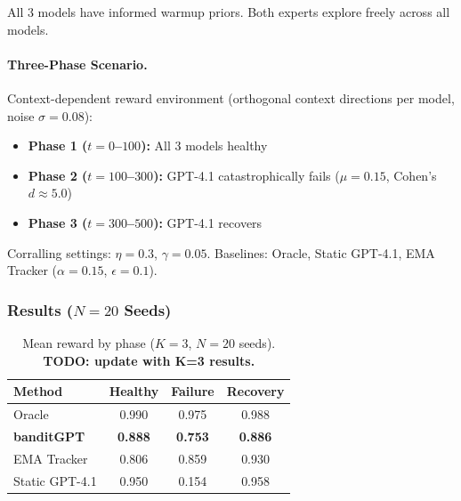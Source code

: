All 3 models have informed warmup priors. Both experts explore freely across all models.

\paragraph{Three-Phase Scenario.}
Context-dependent reward environment (orthogonal context directions per model, noise $\sigma=0.08$):

\begin{itemize}
    \item \textbf{Phase 1 ($t=0$--$100$):} All 3 models healthy
    \item \textbf{Phase 2 ($t=100$--$300$):} GPT-4.1 catastrophically fails ($\mu=0.15$, Cohen's $d\approx 5.0$)
    \item \textbf{Phase 3 ($t=300$--$500$):} GPT-4.1 recovers
\end{itemize}

Corralling settings: $\eta=0.3$, $\gamma=0.05$. Baselines: Oracle, Static GPT-4.1, EMA Tracker ($\alpha=0.15$, $\epsilon=0.1$).

\subsubsection{Results ($N=20$ Seeds)}

%

\begin{table}[h]
\centering
\caption{Mean reward by phase ($K=3$, $N=20$ seeds). \textbf{TODO: update with K=3 results.}}
\label{tab:catastrophic_failure_phases}
\begin{tabular}{lccc}
\toprule
\textbf{Method} & \textbf{Healthy} & \textbf{Failure} & \textbf{Recovery} \\
\midrule
Oracle & 0.990 & 0.975 & 0.988 \\
\textbf{banditGPT} & \textbf{0.888} & \textbf{0.753} & \textbf{0.886} \\
EMA Tracker & 0.806 & 0.859 & 0.930 \\
Static GPT-4.1 & 0.950 & 0.154 & 0.958 \\
\bottomrule
\end{tabular}
\end{table}

